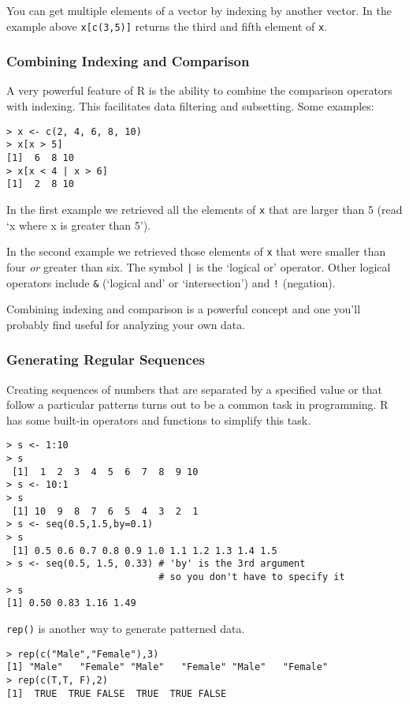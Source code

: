 You can get multiple elements of a vector by indexing by another vector.
In the example above \lstinline!x[c(3,5)]! returns the third and fifth
element of \lstinline!x!.

\subsubsection{Combining Indexing and Comparison}

A very powerful feature of R is the ability to combine the comparison
operators with indexing. This facilitates data filtering and subsetting.
Some examples:

\begin{lstlisting}
> x <- c(2, 4, 6, 8, 10)
> x[x > 5]
[1]  6  8 10
> x[x < 4 | x > 6]
[1]  2  8 10
\end{lstlisting}
In the first example we retrieved all the elements of \lstinline!x! that
are larger than 5 (read `x where x is greater than 5').

In the second example we retrieved those elements of \lstinline!x! that
were smaller than four \emph{or} greater than six. The symbol
\lstinline!|! is the `logical or' operator. Other logical operators
include \lstinline!&! (`logical and' or `intersection') and
\lstinline"!" (negation).

Combining indexing and comparison is a powerful concept and one you'll
probably find useful for analyzing your own data.

\subsubsection{Generating Regular Sequences}

Creating sequences of numbers that are separated by a specified value or
that follow a particular patterns turns out to be a common task in
programming. R has some built-in operators and functions to simplify
this task.

\begin{lstlisting}
> s <- 1:10
> s
 [1]  1  2  3  4  5  6  7  8  9 10
> s <- 10:1
> s
 [1] 10  9  8  7  6  5  4  3  2  1
> s <- seq(0.5,1.5,by=0.1)
> s
 [1] 0.5 0.6 0.7 0.8 0.9 1.0 1.1 1.2 1.3 1.4 1.5
> s <- seq(0.5, 1.5, 0.33) # 'by' is the 3rd argument
                           # so you don't have to specify it
> s
[1] 0.50 0.83 1.16 1.49 
\end{lstlisting}
\lstinline!rep()! is another way to generate patterned data.

\begin{lstlisting}
> rep(c("Male","Female"),3)
[1] "Male"   "Female" "Male"   "Female" "Male"   "Female"
> rep(c(T,T, F),2)
[1]  TRUE  TRUE FALSE  TRUE  TRUE FALSE
\end{lstlisting}
